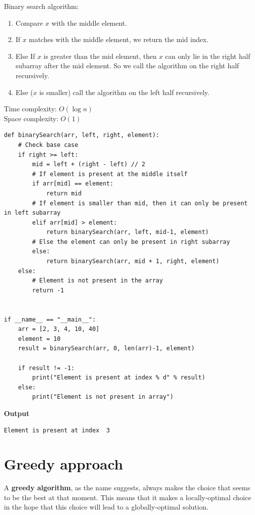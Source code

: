 \documentclass[a4paper,11pt]{book}
\begin{document}
\noindent Binary search algorithm:
\begin{enumerate}
    \item Compare $x$ with the middle element.
    \item If $x$ matches with the middle element, we return the mid index.
    \item Else If $x$ is greater than the mid element, then $x$ can only lie in the right half subarray after the mid element. So we call the algorithm on the right half recursively.
    \item Else ($x$ is smaller) call the algorithm on the left half recursively.
\end{enumerate}
\vspace{5mm}

\noindent Time complexity: $O(\log n)$\\
\noindent Space complexity: $O(1)$

\begin{lstlisting}
def binarySearch(arr, left, right, element):
    # Check base case
    if right >= left:
        mid = left + (right - left) // 2
        # If element is present at the middle itself
        if arr[mid] == element:
            return mid
        # If element is smaller than mid, then it can only be present in left subarray
        elif arr[mid] > element:
            return binarySearch(arr, left, mid-1, element)
        # Else the element can only be present in right subarray
        else:
            return binarySearch(arr, mid + 1, right, element)
    else:
        # Element is not present in the array
        return -1
  
  
if __name__ == "__main__":
    arr = [2, 3, 4, 10, 40]
    element = 10
    result = binarySearch(arr, 0, len(arr)-1, element)
    
    if result != -1:
        print("Element is present at index % d" % result)
    else:
        print("Element is not present in array")
\end{lstlisting}
\textbf{Output}
\begin{lstlisting}
Element is present at index  3
\end{lstlisting}

\section{Greedy approach}

\noindent A \textbf{greedy algorithm}, as the name suggests, always makes the choice that seems to be the best at that moment. This means that it makes a locally-optimal choice in the hope that this choice will lead to a globally-optimal solution.
\end{document}
